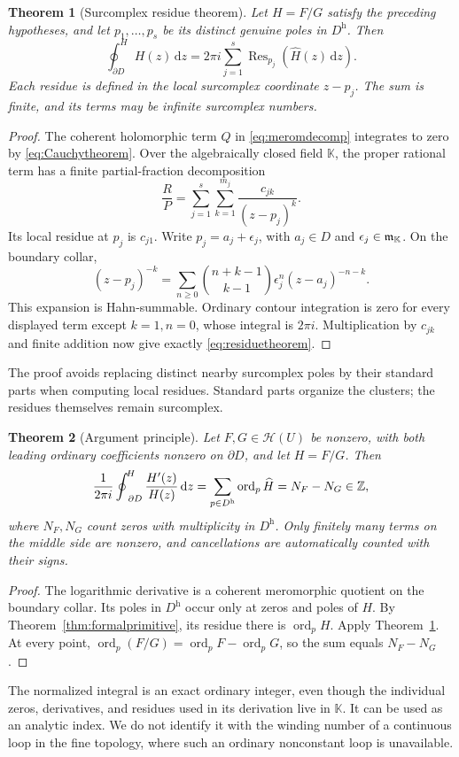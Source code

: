 \documentclass[11pt,a4paper]{article}
\newtheorem{theorem}{Theorem}[section]
\theoremstyle{definition}\newtheorem{definition}[theorem]{Definition}
\theoremstyle{remark}\newtheorem{remark}[theorem]{Remark}
\newcommand{\K}{\mathbb K}
\newcommand{\A}{\mathscr H}\newcommand{\hol}{\mathcal O}
\newcommand{\Res}{\operatorname{Res}}\newcommand{\ord}{\operatorname{ord}}
\newcommand{\ev}[1]{\widehat{#1}}
\newcommand{\hoint}{\mathop{\oint}\nolimits^{\!H}}
\newcommand{\halo}[1]{#1^{\mathrm h}}
\newcommand{\dd}{\,\mathrm d}
\numberwithin{equation}{section}
\begin{document}
\begin{theorem}[Surcomplex residue theorem]\label{thm:residue}
Let $H=F/G$ satisfy the preceding hypotheses, and let $p_1,\dots,p_s$ be its distinct genuine poles in $\halo D$. Then
\begin{equation}\label{eq:residuetheorem}
 \boxed{\quad
 \hoint_{\partial D}H(z)\dd z
 =2\pi i\sum_{j=1}^s\Res_{p_j}(\ev H(z)\dd z).
 \quad}
\end{equation}
Each residue is defined in the local surcomplex coordinate $z-p_j$. The sum is finite, and its terms may be infinite surcomplex numbers.
\end{theorem}
\begin{proof}
The coherent holomorphic term $Q$ in \eqref{eq:meromdecomp} integrates to zero by \eqref{eq:Cauchytheorem}. Over the algebraically closed field $\K$, the proper rational term has a finite partial-fraction decomposition
\[
 \frac RP=\sum_{j=1}^s\sum_{k=1}^{m_j}
                  \frac{c_{jk}}{(z-p_j)^k}.
\]
Its local residue at $p_j$ is $c_{j1}$. Write $p_j=a_j+\epsilon_j$, with $a_j\in D$ and $\epsilon_j\in\infinit$. On the boundary collar,
\[
 (z-p_j)^{-k}=\sum_{n\geq0}
 \binom{n+k-1}{k-1}\epsilon_j^n(z-a_j)^{-n-k}.
\]
This expansion is Hahn-summable. Ordinary contour integration is zero for every displayed term except $k=1,n=0$, whose integral is $2\pi i$. Multiplication by $c_{jk}$ and finite addition now give exactly \eqref{eq:residuetheorem}.
\end{proof}
The proof avoids replacing distinct nearby surcomplex poles by their standard parts when computing local residues. Standard parts organize the clusters; the residues themselves remain surcomplex.

\begin{theorem}[Argument principle]\label{thm:argument}
Let $F,G\in\A(U)$ be nonzero, with both leading ordinary coefficients nonzero on $\partial D$, and let $H=F/G$. Then
\begin{equation}\label{eq:argument}
 \frac1{2\pi i}\hoint_{\partial D}\frac{H'(z)}{H(z)}\dd z
 =\sum_{p\in\halo D}\ord_p\ev H
 =N_F-N_G\in\Z,
\end{equation}
where $N_F,N_G$ count zeros with multiplicity in $\halo D$. Only finitely many terms on the middle side are nonzero, and cancellations are automatically counted with their signs.
\end{theorem}
\begin{proof}
The logarithmic derivative is a coherent meromorphic quotient on the boundary collar. Its poles in $\halo D$ occur only at zeros and poles of $H$. By Theorem~\ref{thm:formalprimitive}, its residue there is $\ord_pH$. Apply Theorem~\ref{thm:residue}. At every point, $\ord_p(F/G)=\ord_pF-\ord_pG$, so the sum equals $N_F-N_G$.
\end{proof}
The normalized integral is an exact ordinary integer, even though the individual zeros, derivatives, and residues used in its derivation live in $\K$. It can be used as an analytic index. We do not identify it with the winding number of a continuous loop in the fine topology, where such an ordinary nonconstant loop is unavailable.
\end{document}
